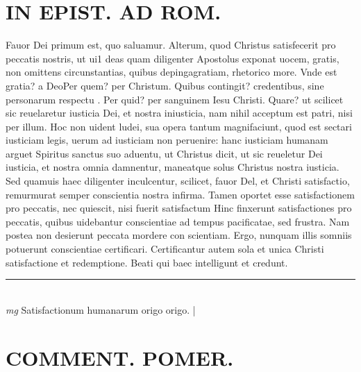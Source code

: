 \documentclass{article}
\begin{document}
\begin{pages}
\section*{IN EPIST. AD ROM.  }
\marginpar{[ p.34 ]}\pstart Fauor Dei primum est, quo saluamur. Alterum, quod Christus satisfecerit pro peccatis nostris, ut ui1 deas quam diligenter Apostolus exponat uocem, gratis, non omittens circunstantias, quibus depingagratiam, rhetorico more. Vnde est gratia? a DeoPer quem? per Christum. Quibus contingit? credentibus, sine personarum respectu . Per quid? per sanguinem Iesu Christi. Quare? ut scilicet sic reuelaretur iusticia Dei, et nostra iniusticia, nam nihil acceptum est patri, nisi per illum. Hoc non uident ludei, sua opera tantum magnifaciunt, quod est sectari iusticiam legis, uerum ad iusticiam non peruenire: hanc iusticiam humanam arguet Spiritus sanctus suo aduentu, ut Christus dicit, ut sic reueletur Dei iusticia, et nostra omnia damnentur, maneatque solus Christus nostra iusticia. Sed quamuis haec diligenter inculcentur, scilicet, fauor Del, et Christi satisfactio, remurmurat semper conscientia nostra infirma. Tamen oportet esse satisfactionem pro peccatis, nec quiescit, nisi fuerit satisfactum Hinc finxerunt satisfactiones pro peccatis, quibus uidebantur conscientiae ad tempus pacificatae, sed frustra. Nam postea non desierunt peccata mordere con scientiam. Ergo, nunquam illis somniis potuerunt conscientiae certificari. Certificantur autem sola et unica Christi satisfactione et redemptione. Beati qui baec intelligunt et credunt.   \pend
\vspace{0.5cm}\noindent
\vspace{0.2cm}\rule{1cm}{0.2pt}\\ 
\hspace{0.2cm}\textit{mg}
\footnotesize Satisfactionum humanarum origo origo. 
\normalsize| 
\section*{COMMENT. POMER. }
{}

\end{pages}
\end{document}
